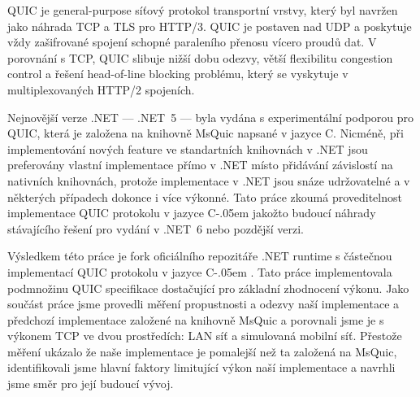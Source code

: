 \documentclass[12pt]{report}
\makeatletter
\newcommand{\csharp}{%
  {\settoheight{\dimen0}{C}C\kern-.05em \resizebox{!}{\dimen0}{\raisebox{\depth}{\#}}}}
\newcommand{\dotnet}{.NET\@}
\makeatother
\begin{document}
QUIC je general-purpose síťový protokol transportní vrstvy, který byl navržen jako náhrada TCP a TLS
pro HTTP/3. QUIC je postaven nad UDP a poskytuje vždy zašifrované spojení schopné paraleního přenosu
vícero proudů dat. V porovnání s TCP, QUIC slibuje nižší dobu odezvy, větší flexibilitu congestion
control a řešení head-of-line blocking problému, který se vyskytuje v multiplexovaných HTTP/2
spojeních.

Nejnovější verze \dotnet{} --- \dotnet{}~5 --- byla vydána s experimentální podporou pro QUIC, která je
založena na knihovně MsQuic napsané v jazyce C. Nicméně, při implementování nových feature ve
standartních knihovnách v \dotnet{} jsou preferovány vlastní implementace přímo v \dotnet{} místo
přidávání závislostí na nativních knihovnách, protože implementace v \dotnet{} jsou snáze
udržovatelné a v některých případech dokonce i více výkonné. Tato práce zkoumá proveditelnost
implementace QUIC protokolu v jazyce \csharp{} jakožto budoucí náhrady stávajícího řešení pro vydání
v \dotnet{}~6 nebo pozdější verzi.

Výsledkem této práce je fork oficiálního repozitáře \dotnet{} runtime s částečnou implementací QUIC
protokolu v jazyce \csharp{}. Tato práce implementovala podmnožinu QUIC specifikace dostačující pro
základní zhodnocení výkonu. Jako součást práce jsme provedli měření propustnosti a odezvy naší
implementace a předchozí implementace založené na knihovně MsQuic a porovnali jsme je s výkonem TCP
ve dvou prostředích: LAN síť a simulovaná mobilní síť. Přestože měření ukázalo že naše implementace
je pomalejší než ta založená na MsQuic, identifikovali jsme hlavní faktory limitující výkon naší
implementace a navrhli jsme směr pro její budoucí vývoj.
\end{document}
